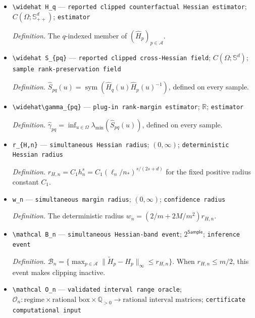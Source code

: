 \documentclass{article}
\begin{document}
\begin{itemize}
  \par\smallskip\noindent\emph{Definition.} The \(q\)-indexed member of \((\widetilde H_p)_{p\in\mathcal A}\).
  \item \texttt{\textbackslash{}\allowbreak{}widehat H\_\allowbreak{}q} --- \texttt{reported clipped counterfactual Hessian estimator}; \(C(\Omega;\mathbb S_{++}^d)\); \texttt{estimator}
  \par\smallskip\noindent\emph{Definition.} The \(q\)-indexed member of \((\widehat H_p)_{p\in\mathcal A}\).
  \item \texttt{\textbackslash{}\allowbreak{}widehat S\_\allowbreak{}\{pq\}\allowbreak{}} --- \texttt{reported clipped cross-\allowbreak{}Hessian field}; \(C(\Omega;\mathbb S^d)\); \texttt{sample rank-\allowbreak{}preservation field}
  \par\smallskip\noindent\emph{Definition.} \(\widehat S_{pq}(u)=\operatorname{sym}(\widehat H_q(u)\widehat H_p(u)^{-1})\), defined on every sample.
  \item \texttt{\textbackslash{}\allowbreak{}widehat\textbackslash{}\allowbreak{}gamma\_\allowbreak{}\{pq\}\allowbreak{}} --- \texttt{plug-\allowbreak{}in rank-\allowbreak{}margin estimator}; \(\mathbb R\); \texttt{estimator}
  \par\smallskip\noindent\emph{Definition.} \(\widehat\gamma_{pq}=\inf_{u\in\Omega}\lambda_{\min}(\widehat S_{pq}(u))\), defined on every sample.
  \item \texttt{r\_\allowbreak{}\{H,\allowbreak{}n\}\allowbreak{}} --- \texttt{simultaneous Hessian radius}; \((0,\infty)\); \texttt{deterministic Hessian radius}
  \par\smallskip\noindent\emph{Definition.} \(r_{H,n}=C_1h_n^s=C_1(\ell_n/n_\ast)^{s/(2s+d)}\) for the fixed positive radius constant \(C_1\).
  \item \texttt{w\_\allowbreak{}n} --- \texttt{simultaneous margin radius}; \((0,\infty)\); \texttt{confidence radius}
  \par\smallskip\noindent\emph{Definition.} The deterministic radius \(w_n=(2/m+2M/m^2)r_{H,n}\).
  \item \texttt{\textbackslash{}\allowbreak{}mathcal B\_\allowbreak{}n} --- \texttt{simultaneous Hessian-\allowbreak{}band event}; \(2^{\mathsf{Sample}}\); \texttt{inference event}
  \par\smallskip\noindent\emph{Definition.} \(\mathcal B_n=\{\max_{p\in\mathcal A}\lVert\widetilde H_p-H_p\rVert_\infty\le r_{H,n}\}\). When \(r_{H,n}\le m/2\), this event makes clipping inactive.
  \item \texttt{\textbackslash{}\allowbreak{}mathcal O\_\allowbreak{}n} --- \texttt{validated interval range oracle}; \(\mathcal O_n:\text{regime}\times\text{rational box}\times\mathbb Q_{>0}\to\text{rational interval matrices}\); \texttt{certificate computational input}

\end{itemize}
\end{document}
